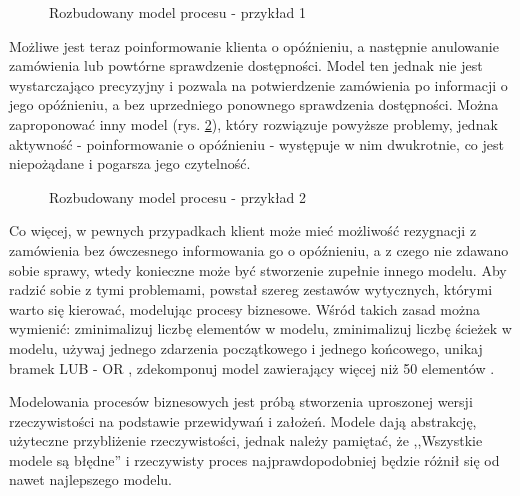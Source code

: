 \begin{figure}[h]
	\caption{\label{fig:complicated_business_process_1}Rozbudowany model procesu - przykład 1}
\end{figure}

Możliwe jest teraz poinformowanie klienta o opóźnieniu, a następnie anulowanie zamówienia lub powtórne sprawdzenie dostępności. Model ten jednak nie jest wystarczająco precyzyjny i pozwala na potwierdzenie zamówienia po informacji o jego opóźnieniu, a bez uprzedniego ponownego sprawdzenia dostępności. Można zaproponować inny model (rys. \ref{fig:complicated_business_process_2}), który rozwiązuje powyższe problemy, jednak aktywność - poinformowanie o opóźnieniu - występuje w nim dwukrotnie, co jest niepożądane i pogarsza jego czytelność.

\begin{figure}[h]
	\caption{\label{fig:complicated_business_process_2}Rozbudowany model procesu - przykład 2}
\end{figure}

Co więcej, w pewnych przypadkach klient może mieć możliwość rezygnacji z zamówienia bez ówczesnego informowania go o opóźnieniu, a z czego nie zdawano sobie sprawy, wtedy konieczne może być stworzenie zupełnie innego modelu. Aby radzić sobie z tymi problemami, powstał szereg zestawów wytycznych, którymi warto się kierować, modelując procesy biznesowe. Wśród takich zasad można wymienić: zminimalizuj liczbę elementów w modelu, zminimalizuj liczbę ścieżek w modelu, używaj jednego zdarzenia początkowego i jednego końcowego, unikaj bramek LUB - OR , zdekomponuj model zawierający więcej niż 50 elementów \cite{7PMG}.

Modelowania procesów biznesowych jest próbą stworzenia uproszonej wersji rzeczywistości na podstawie przewidywań i założeń. Modele dają abstrakcję, użyteczne przybliżenie rzeczywistości, jednak należy pamiętać, że ,,Wszystkie modele są błędne'' i rzeczywisty proces najprawdopodobniej będzie różnił się od nawet najlepszego modelu. 


